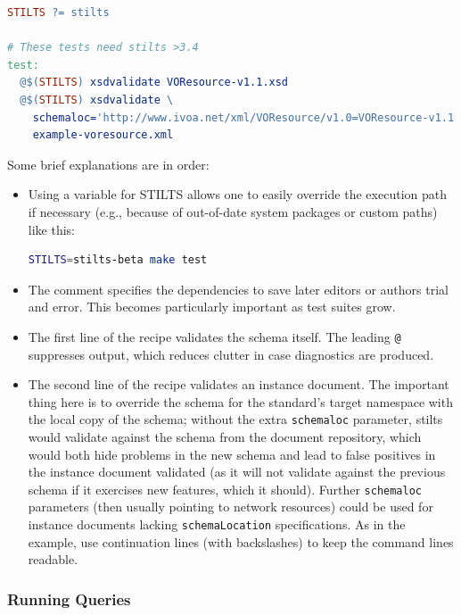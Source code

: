 \documentclass[11pt,a4paper]{ivoa}
\begin{document}
\begin{lstlisting}[language=make,basicstyle=\footnotesize]
STILTS ?= stilts

# These tests need stilts >3.4
test:
  @$(STILTS) xsdvalidate VOResource-v1.1.xsd
  @$(STILTS) xsdvalidate \
    schemaloc='http://www.ivoa.net/xml/VOResource/v1.0=VOResource-v1.1.xsd' \
    example-voresource.xml
\end{lstlisting}

Some brief explanations are in order:

\begin{itemize}
\item Using a variable for STILTS allows one to easily override the
execution path if necessary (e.g., because of out-of-date system
packages or custom paths) like this:

\begin{lstlisting}[language=sh]
STILTS=stilts-beta make test
\end{lstlisting}

\item The comment specifies the dependencies to save later editors or
authors trial and error.  This becomes particularly important as test
suites grow.

\item The first line of the recipe validates the schema itself.  The
leading \verb|@| suppresses output, which reduces clutter in case
diagnostics are produced.

\item The second line of the recipe validates an instance document.  The
important thing here is to override the schema for the standard's target
namespace with the local copy of the schema; without the extra
\verb|schemaloc| parameter, stilts would validate against the schema
from the document repository, which would both hide problems in the new
schema and lead to false positives in the instance document validated
(as it will not validate against the previous schema if it exercises new
features, which it should).  Further \verb|schemaloc| parameters (then
usually pointing to network resources) could be used for instance
documents lacking \verb|schemaLocation| specifications.  As in the
example, use continuation lines (with backslashes) to keep the command
lines readable.

\end{itemize}

\subsubsection{Running Queries}
\end{document}
